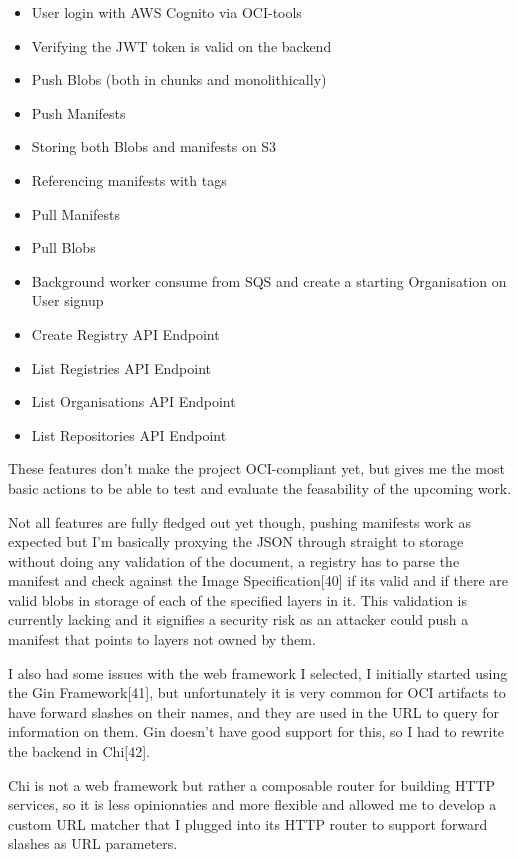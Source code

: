\documentclass{article}
\begin{document}
  \begin{itemize}
    \item User login with AWS Cognito via OCI-tools
    \item Verifying the JWT token is valid on the backend
    \item Push Blobs (both in chunks and monolithically)
    \item Push Manifests
    \item Storing both Blobs and manifests on S3
    \item Referencing manifests with tags
    \item Pull Manifests
    \item Pull Blobs
    \item Background worker consume from SQS and create a starting Organisation on User signup
    \item Create Registry API Endpoint
    \item List Registries API Endpoint
    \item List Organisations API Endpoint
    \item List Repositories API Endpoint 
  \end{itemize}

  These features don't make the project OCI-compliant yet, but gives me the most basic actions to be able to test and evaluate the feasability of the upcoming work.

  Not all features are fully fledged out yet though, pushing manifests work as expected but I'm basically proxying the JSON through straight to storage without doing any validation of the document, a registry has to parse the manifest and check against the Image Specification[40] if its valid and if there are valid blobs in storage of each of the specified layers in it. This validation is currently lacking and it signifies a security risk as an attacker could push a manifest that points to layers not owned by them.

  I also had some issues with the web framework I selected, I initially started using the Gin Framework[41], but unfortunately it is very common for OCI artifacts to have forward slashes on their names, and they are used in the URL to query for information on them. Gin doesn't have good support for this, so I had to rewrite the backend in Chi[42].

  Chi is not a web framework but rather a composable router for building HTTP services, so it is less opinionaties and more flexible and allowed me to develop a custom URL matcher that I plugged into its HTTP router to support forward slashes as URL parameters.
\end{document}
